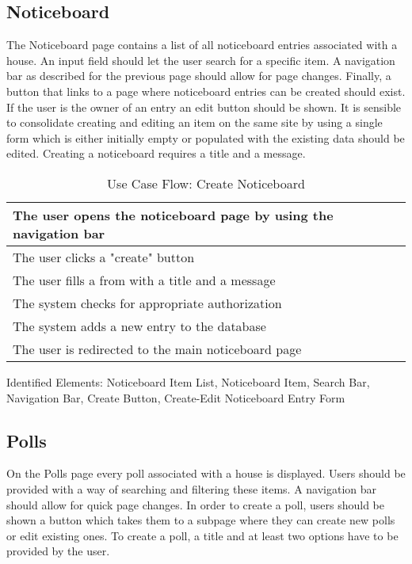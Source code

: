 \subsection{Noticeboard}
The Noticeboard page contains a list of all noticeboard entries associated with a house. An input field should let the user search for a specific item. A navigation bar as described for the previous page should allow for page changes. Finally, a button that links to a page where noticeboard entries can be created should exist. If the user is the owner of an entry an edit button should be shown. It is sensible to consolidate creating and editing an item on the same site by using a single form which is either initially empty or populated with the existing data should be edited. Creating a noticeboard requires a title and a message. \newline

\begin{table}[H]
    \begin{tabularx}{\linewidth}{|X|}
      \hline
       The user opens the noticeboard page by using the navigation bar \\
       \hline
       The user clicks a "create" button \\
       \hline
       The user fills a from with a title and a message \\
       \hline
       The system checks for appropriate authorization \\
       \hline
       The system adds a new entry to the database \\
       \hline
       The user is redirected to the main noticeboard page \\
       \hline 
    \end{tabularx}
    \caption{Use Case Flow: Create Noticeboard}
    \label{usecase:createnoticeboard}
  \end{table}
  
Identified Elements: Noticeboard Item List, Noticeboard Item, Search Bar, Navigation Bar, Create Button, Create-Edit Noticeboard Entry Form

\subsection{Polls}
On the Polls page every poll associated with a house is displayed. Users should be provided with a way of searching and filtering these items. A navigation bar should allow for quick page changes. In order to create a poll, users should be shown a button which takes them to a subpage where they can create new polls or edit existing ones. To create a poll, a title and at least two options have to be provided by the user.

